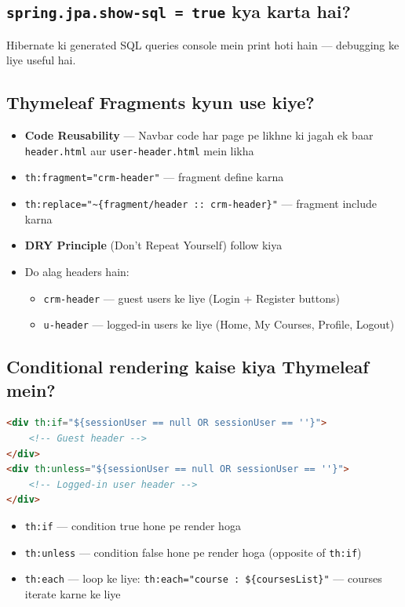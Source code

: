 \documentclass[12pt,a4paper]{article}
\begin{document}
\subsection{\texttt{spring.jpa.show-sql = true} kya karta hai?}

\begin{answerbox}
Hibernate ki generated SQL queries console mein print hoti hain --- debugging ke liye useful hai.
\end{answerbox}

\subsection{Thymeleaf Fragments kyun use kiye?}

\begin{answerbox}
\begin{itemize}
    \item \textbf{Code Reusability} --- Navbar code har page pe likhne ki jagah ek baar \texttt{header.html} aur \texttt{user-header.html} mein likha
    \item \texttt{th:fragment="crm-header"} --- fragment define karna
    \item \texttt{th:replace="\~{}\{fragment/header :: crm-header\}"} --- fragment include karna
    \item \textbf{DRY Principle} (Don't Repeat Yourself) follow kiya
    \item Do alag headers hain:
    \begin{itemize}
        \item \texttt{crm-header} --- guest users ke liye (Login + Register buttons)
        \item \texttt{u-header} --- logged-in users ke liye (Home, My Courses, Profile, Logout)
    \end{itemize}
\end{itemize}
\end{answerbox}

\subsection{Conditional rendering kaise kiya Thymeleaf mein?}

\begin{answerbox}
\begin{lstlisting}[language=HTML]
<div th:if="${sessionUser == null OR sessionUser == ''}">
    <!-- Guest header -->
</div>
<div th:unless="${sessionUser == null OR sessionUser == ''}">
    <!-- Logged-in user header -->
</div>
\end{lstlisting}
\begin{itemize}
    \item \texttt{th:if} --- condition true hone pe render hoga
    \item \texttt{th:unless} --- condition false hone pe render hoga (opposite of \texttt{th:if})
    \item \texttt{th:each} --- loop ke liye: \texttt{th:each="course : \$\{coursesList\}"} --- courses iterate karne ke liye
\end{itemize}
\end{answerbox}
\end{document}
